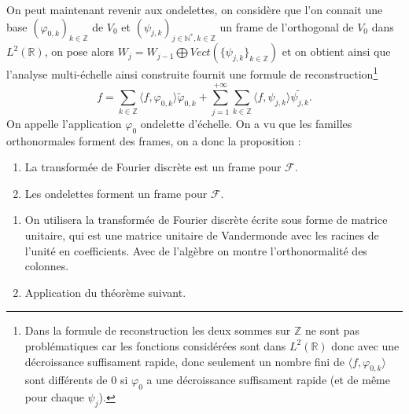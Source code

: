 On peut maintenant revenir aux ondelettes, on considère que l'on connait une base $(\varphi_{0,k})_{k\in \mathbb{Z}}$ de $V_0$ et $(\psi_{j,k})_{j\in \mathbb{N}^*, k \in \mathbb{Z}}$ un frame de l'orthogonal de $V_0$ dans $L^2(\mathbb{R})$, on pose alors $W_j = W_{j-1} \bigoplus Vect(\{\psi_{j,k}\}_{k\in \mathbb{Z}})$ et on obtient ainsi que l'analyse multi-échelle ainsi construite fournit une formule de reconstruction\footnote{Dans la formule de reconstruction les deux sommes sur $\mathbb{Z}$ ne sont pas problématiques car les fonctions considérées sont dans $L^2(\mathbb{R})$ donc avec une décroissance suffisament rapide, donc seulement un nombre fini de $\langle f, \varphi_{0,k} \rangle$ sont différents de 0 si $\varphi_0$ a une décroissance suffisament rapide (et de même pour chaque $\psi_j$).}
\begin{equation}
	f = \sum_{k\in \mathbb{Z}} \langle f, \varphi_{0,k} \rangle \tilde{\varphi}_{0,k} + \sum_{j = 1}^{+\infty} \sum_{k\in \mathbb{Z}} \langle f, \psi_{j,k} \rangle \tilde{\psi_{j,k}}.
\end{equation}
On appelle l'application $\varphi_0$ ondelette d'échelle.
On a vu que les familles orthonormales forment des frames, on a donc la proposition :
\begin{proposition}
	\begin{enumerate}
		\item La transformée de Fourier discrète est un frame pour $\mathcal{F}$.
		\item Les ondelettes forment un frame pour $\mathcal{F}$.
	\end{enumerate}
\end{proposition}
\begin{preuve}
	\begin{enumerate}
		\item On utilisera la transformée de Fourier discrète écrite sous forme de matrice unitaire, qui est une matrice unitaire de Vandermonde avec les racines de l'unité en coefficients. Avec de l'algèbre on montre l'orthonormalité des colonnes.
		\item Application du théorème suivant.
	\end{enumerate}
\end{preuve}

